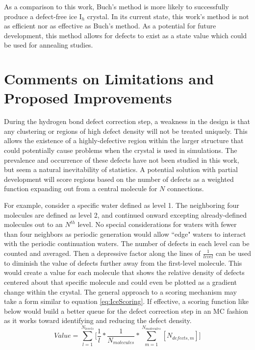 As a comparison to this work, Buch's method is more likely to successfully produce a defect-free ice I$_{h}$ crystal.
In its current state, this work's method is not as efficient nor as effective as Buch's method.
As a potential for future development, this method allows for defects to exist as a state value which could be used for annealing studies.



\section{Comments on Limitations and Proposed Improvements}

During the hydrogen bond defect correction step, a weakness in the design is that any clustering or regions of high defect density will not be treated uniquely.
This allows the existence of a highly-defective region within the larger structure that could potentially cause problems when the crystal is used in simulations. 
The prevalence and occurrence of these defects have not been studied in this work, but seem a natural inevitability of statistics. 
A potential solution with partial development will score regions based on the number of defects as a weighted function expanding out from a central molecule for $N$ connections. 

For example, consider a specific water defined as level 1. 
The neighboring four molecules are defined as level 2, and continued onward excepting already-defined molecules out to an $N^{th}$ level. 
No special considerations for waters with fewer than four neighbors as periodic generation would allow ``edge" waters to interact with the periodic continuation waters.
The number of defects in each level can be counted and averaged.
Then a depressive factor along the lines of $\frac{1}{level}$ can be used to diminish the value of defects further away from the first-level molecule.
This would create a value for each molecule that shows the relative density of defects centered about that specific molecule and could even be plotted as a gradient change within the crystal.
The general approach to a scoring mechanism may take a form similar to equation \ref{eq:IceScoring}.
If effective, a scoring function like below would build a better queue for the defect correction step in an MC fashion as it works toward identifying and reducing the defect density.
\begin{equation}
\label{eq:IceScoring}
Value = \sum_{l=1}^{N_{levels}} \Big[\frac{1}{l} * \frac{1} {N_{molecules}} *\sum_{m=1}^{N_{molecules}}[N_{defects, m}]\Big]
\end{equation}





